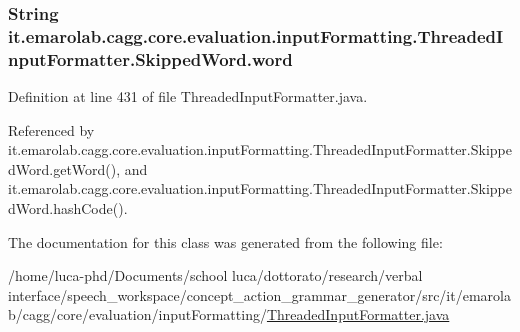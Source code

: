 \hypertarget{classit_1_1emarolab_1_1cagg_1_1core_1_1evaluation_1_1inputFormatting_1_1ThreadedInputFormatter_1_1SkippedWord_ab030fba8d1b4e5e692a94cc94f250355}{
\subsubsection[{word}]{\setlength{\rightskip}{0pt plus 5cm}String it.\-emarolab.\-cagg.\-core.\-evaluation.\-input\-Formatting.\-Threaded\-Input\-Formatter.\-Skipped\-Word.\-word\hspace{0.3cm}{\ttfamily [private]}}}\label{classit_1_1emarolab_1_1cagg_1_1core_1_1evaluation_1_1inputFormatting_1_1ThreadedInputFormatter_1_1SkippedWord_ab030fba8d1b4e5e692a94cc94f250355}


Definition at line 431 of file Threaded\-Input\-Formatter.\-java.



Referenced by it.\-emarolab.\-cagg.\-core.\-evaluation.\-input\-Formatting.\-Threaded\-Input\-Formatter.\-Skipped\-Word.\-get\-Word(), and it.\-emarolab.\-cagg.\-core.\-evaluation.\-input\-Formatting.\-Threaded\-Input\-Formatter.\-Skipped\-Word.\-hash\-Code().



The documentation for this class was generated from the following file\-:\begin{DoxyCompactItemize}
\item 
/home/luca-\/phd/\-Documents/school luca/dottorato/research/verbal interface/speech\-\_\-workspace/concept\-\_\-action\-\_\-grammar\-\_\-generator/src/it/emarolab/cagg/core/evaluation/input\-Formatting/\hyperlink{ThreadedInputFormatter_8java}{Threaded\-Input\-Formatter.\-java}\end{DoxyCompactItemize}
